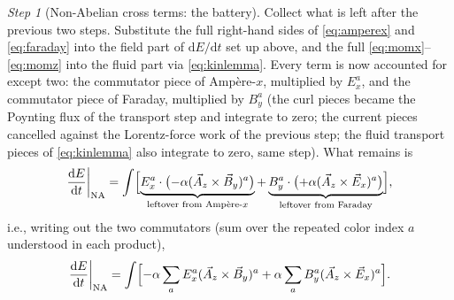 \documentclass[11pt,a4paper]{article}
\numberwithin{equation}{section}
\theoremstyle{remark}
\newtheorem{step}{Step}[subsection]
\newcommand{\dd}{\mathrm{d}}
\begin{document}
\begin{step}[Non-Abelian cross terms: the battery]
Collect what is left after the previous two steps. Substitute the full
right-hand sides of \eqref{eq:amperex} and \eqref{eq:faraday} into the
field part of $\dd E/\dd t$ set up above, and the full
\eqref{eq:momx}--\eqref{eq:momz} into the fluid part via
\eqref{eq:kinlemma}. Every term is now accounted for except two: the
commutator piece of Amp\`ere-$x$, multiplied by $E_x^a$, and the
commutator piece of Faraday, multiplied by $B_y^a$ (the curl pieces became
the Poynting flux of the transport step and integrate to zero; the current
pieces cancelled against the Lorentz-force work of the previous step; the
fluid transport pieces of \eqref{eq:kinlemma} also integrate to zero, same
step). What remains is
\begin{equation}
\frac{\dd E}{\dd t}\bigg|_{\mathrm{NA}}
=\int\Bigl[\underbrace{E_x^a\cdot\bigl(-\alpha(\vec A_z\times\vec B_y)^a\bigr)}
_{\text{leftover from Amp\`ere-}x}
+\underbrace{B_y^a\cdot\bigl(+\alpha(\vec A_z\times\vec E_x)^a\bigr)}
_{\text{leftover from Faraday}}\Bigr],
\end{equation}
i.e., writing out the two commutators (sum over the repeated color index
$a$ understood in each product),
\begin{equation}
\frac{\dd E}{\dd t}\bigg|_{\mathrm{NA}}
=\int\Bigl[-\alpha\sum_a E_x^a(\vec A_z\times\vec B_y)^a
+\alpha\sum_a B_y^a(\vec A_z\times\vec E_x)^a\Bigr].
\end{equation}
\end{step}
\end{document}
